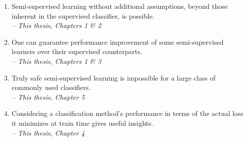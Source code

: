 \documentclass[9pt,b5paper]{book}
\newcommand{\attribute}[1]{\hspace*{1mm}\hfill{\footnotesize\textit{-- #1}}}%
\begin{document}
\begin{enumerate}[leftmargin=1.15em]




\item Semi-supervised learning without additional assumptions, beyond those inherent in the supervised classifier, is possible. \\
\attribute{This thesis, Chapters 1 \& 2}

\item One can guarantee performance improvement of some semi-supervised learners over their supervised counterparts. \\
\attribute{This thesis, Chapters 1 \& 3}

\item Truly safe semi-supervised learning is impossible for a large class of commonly used classifiers.\\
\attribute{This thesis, Chapter 5}

\item Considering a classification method's performance in terms of the actual loss it minimizes at train time gives useful insights. \\ 
\attribute{This thesis, Chapter 4}

% 
% 


\end{enumerate}
\end{document}
